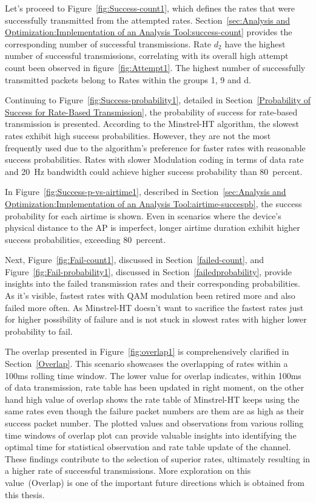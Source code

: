 Let's proceed to Figure~\ref{fig:Success-count1}, which defines the rates that were successfully transmitted from the attempted rates. Section~\ref{sec:Analysis and Optimization:Implementation of an Analysis Tool:success-count} provides the corresponding number of successful transmissions. Rate $d_2$ have the highest number of successful transmissions, correlating with its overall high attempt count been observed in figure~\ref{fig:Attempt1}. The highest number of successfully transmitted packets belong to Rates within the groups 1, 9 and d.

Continuing to Figure~\ref{fig:Success-probability1}, detailed in Section~\ref{Probability of Success for Rate-Based Transmission}, the probability of success for rate-based transmission is presented. According to the Minstrel-HT algorithm, the slowest rates exhibit high success probabilities. However, they are not the most frequently used due to the algorithm's preference for faster rates with reasonable success probabilities. Rates with slower Modulation coding in terms of data rate and 20~Hz bandwidth could achieve higher success probability than 80~percent. 

In Figure~\ref{fig:Success-p-vs-airtime1}, described in Section~\ref{sec:Analysis and Optimization:Implementation of an Analysis Tool:airtime-succespb}, the success probability for each airtime is shown. Even in scenarios where the device's physical distance to the AP is imperfect, longer airtime duration exhibit higher success probabilities, exceeding 80~percent.

Next, Figure~\ref{fig:Fail-count1}, discussed in Section~\ref{failed-count}, and Figure~\ref{fig:Fail-probability1}, discussed in Section~\ref{failedprobability}, provide insights into the failed transmission rates and their corresponding probabilities. As it's visible, fastest rates with QAM modulation been retired more and also failed more often. As Minstrel-HT doesn't want to sacrifice the fastest rates just for higher possibility of failure and is not stuck in slowest rates with higher lower probability to fail.

The overlap presented in Figure~\ref{fig:overlap1} is comprehensively clarified in Section~\ref{Overlap}. This scenario showcases the overlapping of rates within a 100ms rolling time window. The lower value for overlap indicates, within 100ms of data transmission, rate table has been updated in right moment, on the other hand high value of overlap shows the rate table of Minstrel-HT keeps using the same rates even though the failure packet numbers are them are as high as their success packet number. The plotted values and observations from various rolling time windows of overlap plot can provide valuable insights into identifying the optimal time for statistical observation and rate table update of the channel. These findings contribute to the selection of superior rates, ultimately resulting in a higher rate of successful transmissions. More exploration on this value~(Overlap) is one of the important future directions which is obtained from this thesis.

